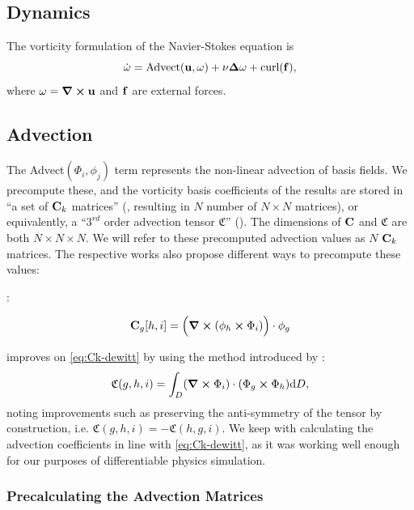 
\subsection*{Dynamics}
The vorticity formulation of the Navier-Stokes equation is
\begin{equation}\label{eq:NSE-vorticity}
    \dot{\bf{\omega}} = \text{Advect}(\bf{u}, \bf{\omega}) + \nu \Delta\bf{\omega}
    + \text{curl}(\bf{f}),
\end{equation}
where $\bf{\omega} = \curl{\bf{u}}$ and $\bf{f}$ are external forces.


\subsection*{Advection}
The Advect$(\Phi_i, \phi_j)$ term represents the non-linear advection of basis
fields. We precompute these, and the vorticity basis coefficients of the results
are stored in ``a set of $\vb{C}_k$ matrices'' (\cite{dewitt}, resulting in $N$
number of $N \times N$ matrices), or equivalently, a ``$3^{rd}$ order advection
tensor $\mathfrak{C}$'' (\cite{scalable-eigenfluids}).  The dimensions of
$\vb{C}$ and $\mathfrak{C}$ are both $N \times N \times N$. We will refer to
these precomputed advection values as $N$ $\vb{C}_k$ matrices.
The respective works also propose different ways to precompute these values:

\cite{dewitt}:

\begin{equation}\label{eq:Ck-dewitt}
\vb{C}_g[h, i] = \Big( \curl(\phi_h \cross \Phi_i)\Big)\cdot \phi_g
\end{equation}

\cite{scalable-eigenfluids} improves on \eqref{eq:Ck-dewitt} by using the method
introduced by \cite{ModelReductionFluidSim}:
\begin{equation}
    \mathfrak{C}(g,h,i) = \int_D (\curl{\Phi_i})\cdot (\Phi_g \cross \Phi_h)
    \text{d}D,
\end{equation}
noting improvements such as preserving the anti-symmetry of the tensor by
construction, i.e. $\mathfrak{C}(g,h,i) = -\mathfrak{C}(h,g,i)$. We keep with
calculating the advection coefficients in line with \eqref{eq:Ck-dewitt}, as it
was working well enough for our purposes of differentiable physics simulation.

\subsubsection*{Precalculating the Advection Matrices}




















